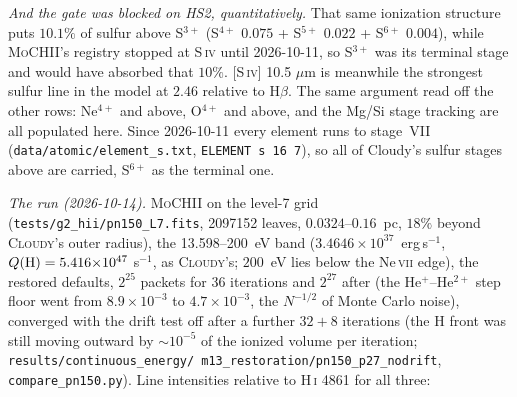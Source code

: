 \documentclass[english,a4paper]{my_memo}
\newcommand{\code}[1]{\texttt{#1}}
\newcommand{\MoCHII}{\textsc{MoCHII}}
\newcommand{\Cloudy}{\textsc{Cloudy}}
\begin{document}
\emph{And the gate was blocked on HS2, quantitatively.}  That same
ionization structure puts $10.1\%$ of sulfur above S$^{3+}$
(S$^{4+}$ $0.075$ + S$^{5+}$ $0.022$ + S$^{6+}$ $0.004$), while
\MoCHII{}'s registry stopped at S\,\textsc{iv} until 2026-10-11, so
S$^{3+}$ was its terminal stage and would have absorbed that $10\%$.
[S\,\textsc{iv}] 10.5 $\mu$m is meanwhile the strongest sulfur line in the
model at $2.46$ relative to H$\beta$.  The same argument read off the other
rows: Ne$^{4+}$ and above, O$^{4+}$ and above, and the Mg/Si stage tracking
are all populated here.  Since 2026-10-11 every element runs to stage~VII
(\code{data/atomic/element\_s.txt}, \code{ELEMENT s 16 7}), so all of
Cloudy's sulfur stages above are carried, S$^{6+}$ as the terminal one.

\emph{The run (2026-10-14).}  \MoCHII{} on the level-7 grid
(\code{tests/g2\_hii/pn150\_L7.fits}, 2097152 leaves, $0.0324$--$0.16$~pc,
$18\%$ beyond \Cloudy{}'s outer radius), the 13.598--200~eV band
($3.4646{\times}10^{37}$~erg\,s$^{-1}$, $Q({\rm H}) = 5.416{\times}10^{47}$
s$^{-1}$, as \Cloudy{}'s; $200$~eV lies below the Ne\,\textsc{vii} edge),
the restored defaults, $2^{25}$ packets for 36 iterations and $2^{27}$
after (the He$^+$--He$^{2+}$ step floor went from $8.9{\times}10^{-3}$ to
$4.7{\times}10^{-3}$, the $N^{-1/2}$ of Monte Carlo noise), converged
with the drift test off after a further $32 + 8$ iterations (the H front
was still moving outward by ${\sim}10^{-5}$ of the ionized volume per
iteration; \code{results/\allowbreak continuous\_energy/\allowbreak
m13\_restoration/\allowbreak pn150\_p27\_nodrift}, \code{compare\_pn150.py}).
Line intensities relative to H\,\textsc{i} 4861 for all three:
\end{document}
